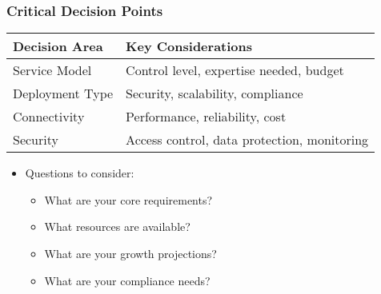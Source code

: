 \documentclass{beamer}
\begin{document}
\begin{frame}
    \frametitle{Critical Decision Points}
    
    \begin{tabular}{|p{}|p{}|}
        \hline
        \textbf{Decision Area} & \textbf{Key Considerations} \\
        \hline
        Service Model & Control level, expertise needed, budget \\
        \hline
        Deployment Type & Security, scalability, compliance \\
        \hline
        Connectivity & Performance, reliability, cost \\
        \hline
        Security & Access control, data protection, monitoring \\
        \hline
    \end{tabular}
    
    \begin{itemize}
        \item Questions to consider:
        \begin{itemize}
            \item What are your core requirements?
            \item What resources are available?
            \item What are your growth projections?
            \item What are your compliance needs?
        \end{itemize}
    \end{itemize}
\end{frame}
\end{document}
